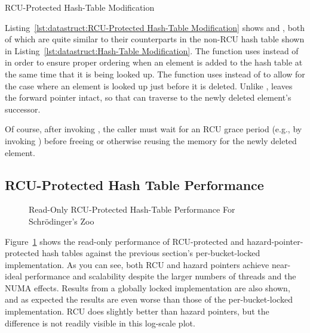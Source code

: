 \begin{listing}[tb]

\caption{RCU-Protected Hash-Table Modification}
\label{lst:datastruct:RCU-Protected Hash-Table Modification}
\end{listing}

Listing~\ref{lst:datastruct:RCU-Protected Hash-Table Modification}
shows  and , both of which
are quite similar to their counterparts in the non-RCU hash table
shown in
Listing~\ref{lst:datastruct:Hash-Table Modification}.
The  function uses  instead
of  in order to ensure proper ordering when
an element is added to the hash table at the same time that it is
being looked up.
The  function uses  instead
of  to allow for the case where an element is
looked up just before it is deleted.
Unlike ,  leaves the
forward pointer intact, so that  can traverse
to the newly deleted element's successor.

Of course, after invoking , the caller must wait for
an RCU grace period (e.g., by invoking ) before
freeing or otherwise reusing the memory for the newly deleted element.

\subsection{RCU-Protected Hash Table Performance}
\label{sec:datastruct:RCU-Protected Hash Table Performance}

\begin{figure}[tb]
\centering
{}
\caption{Read-Only RCU-Protected Hash-Table Performance For Schr\"odinger's Zoo}
\label{fig:datastruct:Read-Only RCU-Protected Hash-Table Performance For Schroedinger's Zoo}
\end{figure}

Figure~\ref{fig:datastruct:Read-Only RCU-Protected Hash-Table Performance For Schroedinger's Zoo}
shows the read-only performance of RCU-protected and hazard-pointer-protected
hash tables against the previous section's per-bucket-locked implementation.
As you can see, both RCU and hazard pointers achieve near-ideal performance
and scalability despite the larger numbers of threads and the NUMA effects.
Results from a globally locked implementation are also shown, and as expected
the results are even worse than those of the per-bucket-locked implementation.
RCU does slightly better than hazard pointers, but the difference is not
readily visible in this log-scale plot.


